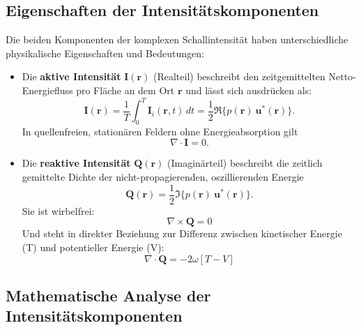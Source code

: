 \subsection{Eigenschaften der Intensitätskomponenten
\label{helmholtz:subsection:def_Schallintensitaet}}

Die beiden Komponenten der komplexen Schallintensität haben
unterschiedliche physikalische Eigenschaften und Bedeutungen:

\begin{itemize}
\item Die \textbf{aktive Intensität} $\boldsymbol{I}(\boldsymbol{r})$ (Realteil) beschreibt den zeitgemittelten Netto-Energiefluss pro Fläche an dem Ort $\boldsymbol{r}$ und lässt sich ausdrücken als:
\begin{equation}
\boldsymbol{I}(\boldsymbol{r})
=
\frac{1}{T}\int_0^T \boldsymbol{I}_i(\boldsymbol{r},t)\,dt
=
\frac{1}{2}\Re\{p(\boldsymbol{r})~\boldsymbol{u}^*(\boldsymbol{r})\}.
\end{equation}
In quellenfreien, stationären Feldern ohne Energieabsorption gilt
\begin{equation}
\nabla \cdot \boldsymbol{I} = 0.
\end{equation}

\item Die \textbf{reaktive Intensität} $\boldsymbol{Q}(\boldsymbol{r})$ (Imaginärteil) beschreibt die zeitlich gemittelte Dichte der nicht-propagierenden, oszillierenden Energie
\begin{equation}
\boldsymbol{Q}(\boldsymbol{r}) = \frac{1}{2}\Im\{p(\boldsymbol{r})~\boldsymbol{u}^*(\boldsymbol{r})\}.
\label{helmholtz:equationReaktiveIntensitaet}
\end{equation}
Sie ist wirbelfrei:
\begin{equation}
\nabla \times \boldsymbol{Q} = 0
\end{equation}
Und steht in direkter Beziehung zur Differenz zwischen kinetischer Energie (T) und potentieller Energie (V):
\begin{equation}
\nabla \cdot \boldsymbol{Q} = -2 \omega [T-V]
\end{equation}
\end{itemize}


\subsection{Mathematische Analyse der Intensitätskomponenten
\label{helmholtz:subsection:def_Schallintensitaet}}

